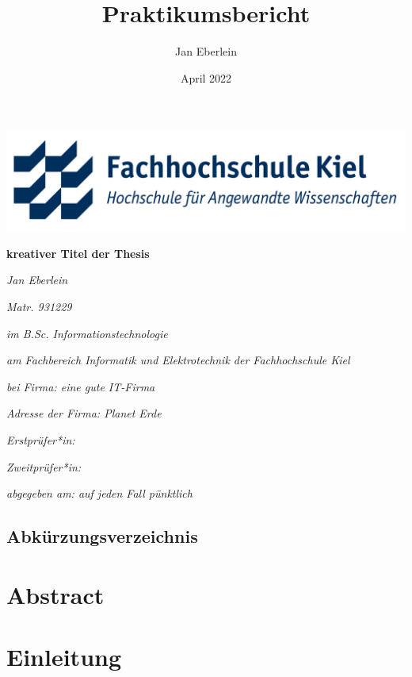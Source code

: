 \documentclass[12pt]{report}
\title{Praktikumsbericht}
\author{Jan Eberlein}
\date{April 2022}
\begin{document}
\begin{titlepage}
	\centering
	\includegraphics[width=1\textwidth]{images/FHKielLogo.png}\par\vspace{1cm}
	\vspace{1.5cm}
	{\huge\bfseries kreativer Titel der Thesis\par}
	\vspace{2cm}
	{\Large\itshape Jan Eberlein\par}
	{\Large\itshape Matr. 931229\par}
	{\Large\itshape im B.Sc. Informationstechnologie\par}
	{\Large\itshape am Fachbereich Informatik und Elektrotechnik der Fachhochschule Kiel\par}
	\vfill
	{\Large\itshape bei Firma: eine gute IT-Firma\par}
	{\Large\itshape Adresse der Firma: Planet Erde\par}
	{\Large\itshape Erstprüfer*in: \par}
	{\Large\itshape Zweitprüfer*in: \par}
	\vfill
	
	{\Large\itshape abgegeben am: auf jeden Fall pünktlich\par}

\end{titlepage}


\tableofcontents
\newpage

\section*{Abkürzungsverzeichnis}

\newpage


\chapter{Abstract}
\label{chapter:abstract}


\chapter{Einleitung}

\end{document}
